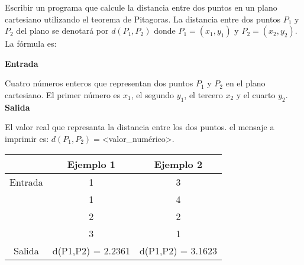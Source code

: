 
\question Escribir un programa que calcule la distancia entre dos puntos en
          un plano cartesiano utilizando el teorema de Pitagoras. La
          distancia entre dos puntos $P_1$ y $P_2$ del plano se denotará por
          $d(P_1,P_2)$ donde $P_1=(x_1,y_1)$ y $P_2=(x_2,y_2)$. La fórmula es:


\textbf{Entrada}

Cuatro números enteros que representan dos puntos $P_1$ y $P_2$ en el plano
cartesiano. El primer número es $x_1$, el segundo $y_1$, el tercero $x_2$ y
el cuarto $y_2$. \\

\textbf{Salida}

El valor real que represanta la distancia entre los dos puntos. el mensaje a
imprimir es: $d(P_1,P_2)=$<valor\_numérico>.

\begin{center}
  \begin{tabular}{|c|c|c|}
     \hline
     \rowcolor[HTML]{C0C0C0}
             & Ejemplo 1 & Ejemplo 2 \\
     \hline
     Entrada & 1         &  3 \\
             & 1         &  4 \\
             & 2         &  2 \\
             & 3         &  1 \\
     \hline
     Salida  & d(P1,P2) = 2.2361 & d(P1,P2) = 3.1623 \\
     \hline
  \end{tabular}
\end{center}
          
